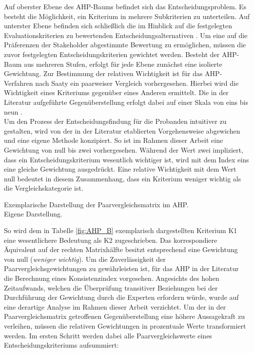 Auf oberster Ebene des AHP-Baums befindet sich das Entscheidungsproblem. Es besteht die Möglichkeit, ein Kriterium in mehrere Subkriterien zu unterteilen. Auf unterster Ebene befinden sich schließlich die im Hinblick auf die festgelegten Evaluationskriterien zu bewertenden Entscheidungsalternativen \cite[86]{Saaty.2008}. Um eine auf die Präferenzen der Stakeholder abgestimmte Bewertung zu ermöglichen, müssen die zuvor festgelegten Entscheidungskriterien gewichtet werden. Besteht der AHP-Baum aus mehreren Stufen, erfolgt für jede Ebene zunächst eine isolierte Gewichtung. Zur Bestimmung der relativen Wichtigkeit ist für das AHP-Verfahren nach Saaty ein paarweiser Vergleich vorhergesehen. Hierbei wird die Wichtigkeit eines Kriteriums gegenüber eines Anderen ermittelt. Die in der Literatur aufgeführte Gegenüberstellung erfolgt dabei auf einer Skala von eins bis neun \cite[86]{Saaty.2008}.\\ Um den Prozess der Entscheidungsfindung für die Probanden intuitiver zu gestalten, wird von der in der Literatur etablierten Vorgehensweise abgewichen und eine eigene Methode konzipiert. So ist im Rahmen dieser Arbeit eine Gewichtung von null bis zwei vorhergesehen. Während der Wert zwei impliziert, dass ein Entscheidungskriterium wesentlich wichtiger ist, wird mit dem Index eins eine gleiche Gewichtung ausgedrückt. Eine relative Wichtigkeit mit dem Wert null bedeutet in diesem Zusammenhang, dass ein Kriterium weniger wichtig als die Vergleichskategorie ist.  
\begin{center}
	\begin{table}[H]
		\centering
		\caption[Exemplarische Darstellung der Paarvergleichsmatrix im AHP]{Exemplarische Darstellung der Paarvergleichsmatrix im AHP.\\ Eigene Darstellung.}
		\label{fig:AHP_B}
	\end{table}
\end{center}
\vspace*{-15mm}
So wird dem in Tabelle \ref{fig:AHP_B} exemplarisch dargestellten Kriterium K1 eine wesentlichere Bedeutung als K2 zugeschrieben. Das korrespondiere Äquivalent auf der rechten Matrixhälfte besitzt entsprechend eine Gewichtung von null (\textit{weniger wichtig}). Um die Zuverlässigkeit der Paarvergleichsgewichtungen zu gewährleisten ist, für das AHP in der Literatur die Berechnung eines Konsistenzindex vorgesehen. Angesichts des hohen Zeitaufwands, welchen die Überprüfung transitiver Beziehungen bei der Durchführung der Gewichtung durch die Experten erfordern würde, wurde auf eine derartige Analyse im Rahmen dieser Arbeit verzichtet. Um der in der Paarvergleichsmatrix getroffenen Gegenüberstellung eine höhere Aussagekraft zu verleihen, müssen die relativen Gewichtungen in prozentuale Werte transformiert werden. Im ersten Schritt werden dabei alle Paarvergleichswerte eines Entscheidungskriteriums aufsummiert:\\
